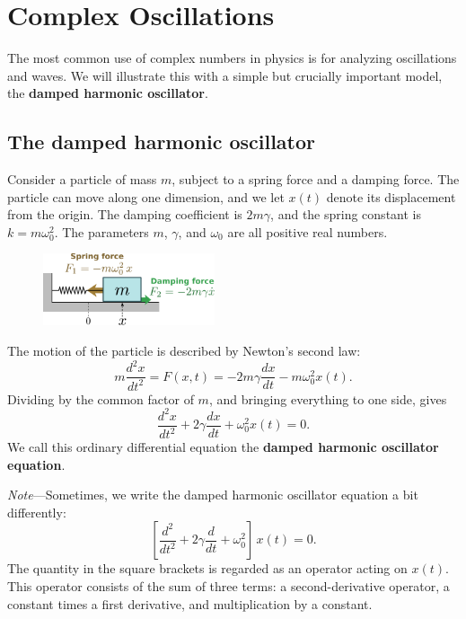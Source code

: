 \documentclass[10pt,a4paper]{article}
\begin{document}
\setcounter{page}{29}
    
\section{Complex Oscillations}
\label{complex-oscillations}

The most common use of complex numbers in physics is for analyzing
oscillations and waves. We will illustrate this with a simple but
crucially important model, the \textbf{damped harmonic oscillator}.

\subsection{The damped harmonic oscillator}
\label{the-damped-harmonic-oscillator}

Consider a particle of mass $m$, subject to a spring force and a
damping force. The particle can move along one dimension, and we let
$x(t)$ denote its displacement from the origin. The damping
coefficient is $2m \gamma$, and the spring constant is
$k = m\omega_0^2$. The parameters $m$, $\gamma$, and $\omega_0$
are all positive real numbers.

\begin{figure}[h]
  \centering\includegraphics[width=0.45\textwidth]{oscillator}
\end{figure}

\noindent
The motion of the particle is described by Newton's second law:
\begin{equation}
m \frac{d^2 x}{dt^2} = F(x,t) = - 2m\gamma \frac{dx}{dt} - m\omega_0^2 x(t).
\end{equation}
Dividing by the common factor of $m$, and bringing everything to one
side, gives
\begin{equation}
  \frac{d^2 x}{dt^2} + 2\gamma \frac{dx}{dt} + \omega_0^2 x(t) = 0.
\end{equation}
We call this ordinary differential equation the \textbf{damped harmonic
oscillator equation}.

\begin{framed} \noindent
  \textit{Note}---Sometimes, we write the damped harmonic oscillator
  equation a bit differently:
  \begin{equation*}
    \left[\frac{d^2}{dt^2} + 2\gamma \frac{d}{dt} + \omega_0^2 \right]\, x(t) = 0.
  \end{equation*}
  The quantity in the square brackets is regarded as an operator
  acting on $x(t)$. This operator consists of the sum of three terms:
  a second-derivative operator, a constant times a first derivative,
  and multiplication by a constant.
\end{framed}
\end{document}
